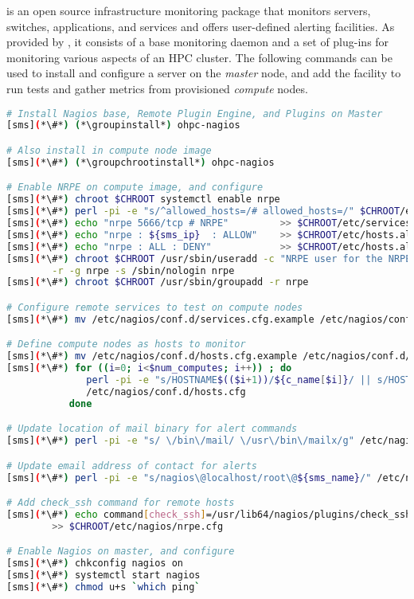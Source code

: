 \Nagios{} is an open source infrastructure monitoring package that monitors
servers, switches, applications, and services and offers user-defined alerting
facilities. As provided by \OHPC{}, it consists of a base monitoring daemon and
a set of plug-ins for monitoring various aspects of an HPC cluster. The
following commands can be used to install and configure a \Nagios{} server on the {\em
master} node, and add the facility to run tests and gather metrics from
provisioned {\em compute} nodes.

\begin{lstlisting}[language=bash,keywords={},upquote=true]
# Install Nagios base, Remote Plugin Engine, and Plugins on Master
[sms](*\#*) (*\groupinstall*) ohpc-nagios

# Also install in compute node image
[sms](*\#*) (*\groupchrootinstall*) ohpc-nagios

# Enable NRPE on compute image, and configure
[sms](*\#*) chroot $CHROOT systemctl enable nrpe
[sms](*\#*) perl -pi -e "s/^allowed_hosts=/# allowed_hosts=/" $CHROOT/etc/nagios/nrpe.cfg
[sms](*\#*) echo "nrpe 5666/tcp # NRPE"         >> $CHROOT/etc/services
[sms](*\#*) echo "nrpe : ${sms_ip}  : ALLOW"    >> $CHROOT/etc/hosts.allow
[sms](*\#*) echo "nrpe : ALL : DENY"            >> $CHROOT/etc/hosts.allow
[sms](*\#*) chroot $CHROOT /usr/sbin/useradd -c "NRPE user for the NRPE service" -d /var/run/nrpe \
        -r -g nrpe -s /sbin/nologin nrpe
[sms](*\#*) chroot $CHROOT /usr/sbin/groupadd -r nrpe

# Configure remote services to test on compute nodes
[sms](*\#*) mv /etc/nagios/conf.d/services.cfg.example /etc/nagios/conf.d/services.cfg

# Define compute nodes as hosts to monitor
[sms](*\#*) mv /etc/nagios/conf.d/hosts.cfg.example /etc/nagios/conf.d/hosts.cfg
[sms](*\#*) for ((i=0; i<$num_computes; i++)) ; do
              perl -pi -e "s/HOSTNAME$(($i+1))/${c_name[$i]}/ || s/HOST$(($i+1))_IP/${c_ip[$i]}/" \
              /etc/nagios/conf.d/hosts.cfg
           done

# Update location of mail binary for alert commands
[sms](*\#*) perl -pi -e "s/ \/bin\/mail/ \/usr\/bin\/mailx/g" /etc/nagios/objects/commands.cfg

# Update email address of contact for alerts
[sms](*\#*) perl -pi -e "s/nagios\@localhost/root\@${sms_name}/" /etc/nagios/objects/contacts.cfg

# Add check_ssh command for remote hosts
[sms](*\#*) echo command[check_ssh]=/usr/lib64/nagios/plugins/check_ssh localhost \
        >> $CHROOT/etc/nagios/nrpe.cfg

# Enable Nagios on master, and configure
[sms](*\#*) chkconfig nagios on
[sms](*\#*) systemctl start nagios
[sms](*\#*) chmod u+s `which ping`
\end{lstlisting}

